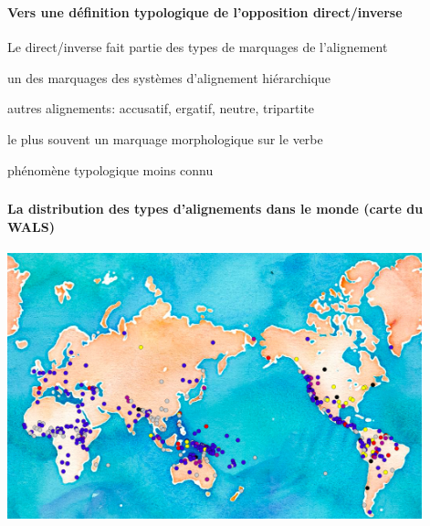\begin{frame}
\frametitle{}
\framesubtitle{Vers une définition typologique de l'opposition direct/inverse}
\begin{wideitemize}
\item Le direct/inverse fait partie des types de marquages de
  l'alignement
\begin{smallwideitemize}
\item un des marquages des systèmes d'alignement hiérarchique
\item autres alignements: accusatif, ergatif, neutre, tripartite
\item le plus souvent un marquage morphologique sur le verbe
\pause
\item phénomène typologique moins connu
\end{smallwideitemize}
\end{wideitemize}
\end{frame}


\begin{frame}
\frametitle{}
\framesubtitle{La distribution des types d'alignements 
  dans le monde (carte du WALS)}
\begin{center}
\vspace*{-.3cm}
\includegraphics[width=120mm]{hierarchy}

\end{center}
\end{frame}


